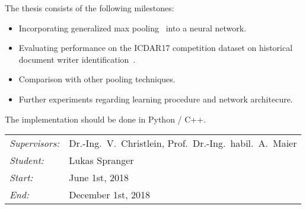 \documentclass[12pt,a4paper]{article}
\begin{document}
The thesis consists of the following milestones:
\begin{itemize}
	\item Incorporating generalized max pooling~\cite{murray2017interferences,murray2014generalized} into a neural network.
	      	      	      	      	      	      	      		      		      	      	      	      	      	      	      	      	      	      	
	\item Evaluating performance on the ICDAR17	competition dataset on historical	document writer identification~\cite{ICDAR2017WI}.
	      	      	      	      	      	      	      		      		      	      	      	      	      	      	      	      	      	      
	\item Comparison with other pooling techniques.
	      	      	      	      	      	      	      		      		      	      	      	      	      	      	      	      	      	      	
	\item Further experiments regarding learning procedure and network architecure.
	      	      	      	      	      	      	      		      		      	      	      	      	      	      	      	      	      	      
\end{itemize}
		
		
The implementation should be done in Python / C++.\\
		
\begin{tabular}{ll}
	\emph{Supervisors:} & Dr.-Ing.~V.~Christlein,  Prof.~Dr.-Ing.~habil.~A.~Maier 
	\\
	\emph{Student:}     & Lukas Spranger                                            
	\\
	\emph{Start:}       & June 1st, 2018                                            \\
	\emph{End:}         & December 1st, 2018                                        \\
\end{tabular}
\nopagebreak[4]
\small

		
\end{document}
